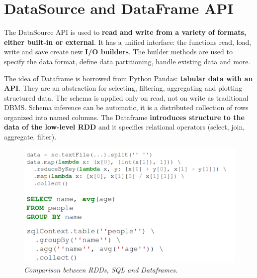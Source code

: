 \section{DataSource and DataFrame API}
	\par
	The DataSource API is used to \textbf{read and write from a variety of formats, either built-in or external}.
	\newline
	It has a unified interface: the functions read, load, write and save create new \textbf{I/O builders}. The builder methods are used to specify the data format, define data partitioning, handle existing data and more.
	\newline
	\par
	The idea of Dataframe is borrowed from Python Pandas: \textbf{tabular data with an API}. They are an abstraction for selecting, filtering, aggregating and plotting structured data.
	\newline
	The schema is applied only on read, not on write as traditional DBMS. Schema inference can be automatic, it is a distributed collection of rows organized into named columns.
	\newline
	The Dataframe \textbf{introduces structure to the data of the low-level RDD} and it specifies relational operators (select, join, aggregate, filter).
	\begin{figure}[H]
		\centering
		\includegraphics[width=0.8\linewidth]{images/dataframe.png}
		\caption{\textit{Comparison between RDDs, SQL and Dataframes.}}
	\end{figure}

